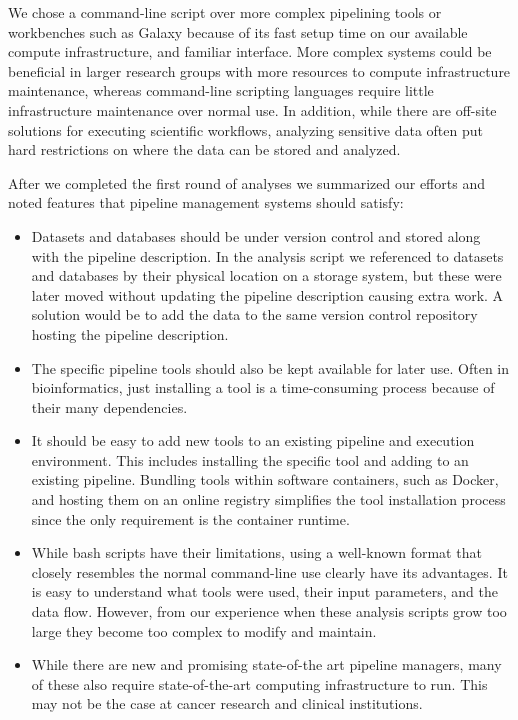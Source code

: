 We chose a command-line script over more complex pipelining tools or workbenches
such as Galaxy\cite{goecks2010galaxy} because of its fast setup time on our
available compute infrastructure, and familiar interface. More complex systems
could be beneficial in larger research groups with more resources to compute
infrastructure maintenance, whereas command-line scripting languages require
little infrastructure maintenance over normal use. In addition, while there are
off-site solutions for executing scientific workflows, analyzing sensitive data
often put hard restrictions on where the data can be stored and analyzed.

After we completed the first round of analyses we summarized our efforts and
noted features that pipeline management systems should satisfy: 
\begin{itemize}
    \item  Datasets and databases should be under version control and stored
        along with the pipeline description. In the analysis script we
        referenced to datasets and databases by their physical location on a
        storage system, but these were later moved without updating the pipeline
        description causing extra work. A solution would be to add the data to
        the same version control repository hosting the pipeline description.
    \item The specific pipeline tools should also be kept available for
        later use. Often in bioinformatics, just installing a tool is a
        time-consuming process because of their many dependencies. 
    \item It should be easy to add new tools to an existing
        pipeline and execution environment. This includes installing the specific
        tool and adding to an existing pipeline. Bundling tools within software
        containers, such as Docker, and hosting them on an online registry
        simplifies the tool installation process since the only requirement is
        the container runtime.
    \item While bash scripts have their
        limitations, using a well-known format that closely resembles the normal
        command-line use clearly have its advantages. It is easy to understand
        what tools were used, their input parameters, and the data flow.
        However, from our experience when these analysis scripts grow too large
        they become too complex to modify and maintain. 
    \item While there are new and promising state-of-the art pipeline
        managers, many of these also require state-of-the-art computing
        infrastructure to run. This may not be the case at cancer research
        and clinical institutions. 
\end{itemize} 


